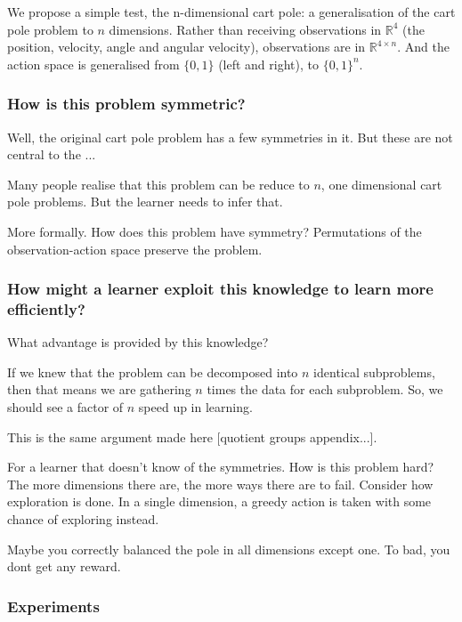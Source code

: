 We propose a simple test, the n-dimensional cart pole: a generalisation of the
cart pole problem to $n$ dimensions. Rather than receiving observations in
$\mathbb{R}^4$ (the position, velocity, angle and angular velocity), observations are
in $\mathbb{R}^{4\times n}$. And the action space is generalised from $\{0,1\}$ (left and right),
to $\{0,1\}^{n}$.

\cite{Brockman2016,baselines}



\subsubsection{How is this problem symmetric?}

Well, the original cart pole problem has a few symmetries in it. But these are
not central to the ...

Many people realise that this problem can be reduce to $n$, one dimensional cart pole problems.
But the learner needs to infer that.

More formally. How does this problem have symmetry?
Permutations of the observation-action space preserve the problem.

\subsubsection{How might a learner exploit this knowledge to learn more efficiently?}

What advantage is provided by this knowledge?

If we knew that the problem can be decomposed into $n$ identical subproblems,
then that means we are gathering $n$ times the data for each subproblem.
So, we should see a factor of $n$ speed up in learning.

This is the same argument made here [quotient groups appendix...].

For a learner that doesn't know of the symmetries. How is this problem hard?
The more dimensions there are, the more ways there are to fail.
Consider how exploration is done. In a single dimension, a greedy action is
taken with some chance of exploring instead.

Maybe you correctly balanced the pole in all dimensions except one. To bad, you dont get any reward.



\subsubsection{Experiments}

